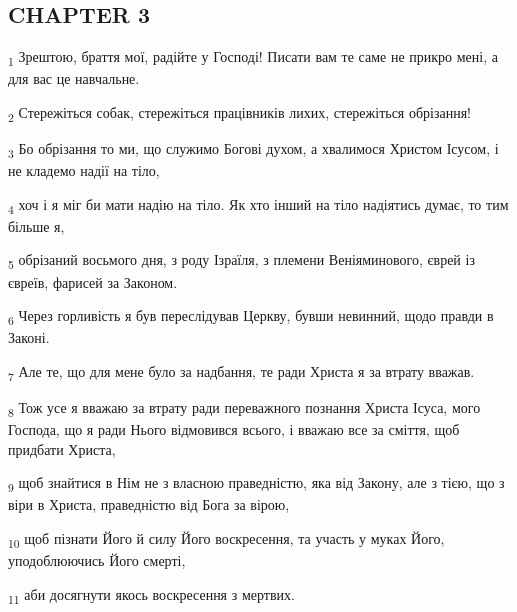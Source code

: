 \subsection{CHAPTER 3}
\begin{tcolorbox}
\textsubscript{1} Зрештою, браття мої, радійте у Господі! Писати вам те саме не прикро мені, а для вас це навчальне.
\end{tcolorbox}
\begin{tcolorbox}
\textsubscript{2} Стережіться собак, стережіться працівників лихих, стережіться обрізання!
\end{tcolorbox}
\begin{tcolorbox}
\textsubscript{3} Бо обрізання то ми, що служимо Богові духом, а хвалимося Христом Ісусом, і не кладемо надії на тіло,
\end{tcolorbox}
\begin{tcolorbox}
\textsubscript{4} хоч і я міг би мати надію на тіло. Як хто інший на тіло надіятись думає, то тим більше я,
\end{tcolorbox}
\begin{tcolorbox}
\textsubscript{5} обрізаний восьмого дня, з роду Ізраїля, з племени Веніяминового, єврей із євреїв, фарисей за Законом.
\end{tcolorbox}
\begin{tcolorbox}
\textsubscript{6} Через горливість я був переслідував Церкву, бувши невинний, щодо правди в Законі.
\end{tcolorbox}
\begin{tcolorbox}
\textsubscript{7} Але те, що для мене було за надбання, те ради Христа я за втрату вважав.
\end{tcolorbox}
\begin{tcolorbox}
\textsubscript{8} Тож усе я вважаю за втрату ради переважного познання Христа Ісуса, мого Господа, що я ради Нього відмовився всього, і вважаю все за сміття, щоб придбати Христа,
\end{tcolorbox}
\begin{tcolorbox}
\textsubscript{9} щоб знайтися в Нім не з власною праведністю, яка від Закону, але з тією, що з віри в Христа, праведністю від Бога за вірою,
\end{tcolorbox}
\begin{tcolorbox}
\textsubscript{10} щоб пізнати Його й силу Його воскресення, та участь у муках Його, уподоблюючись Його смерті,
\end{tcolorbox}
\begin{tcolorbox}
\textsubscript{11} аби досягнути якось воскресення з мертвих.
\end{tcolorbox}
